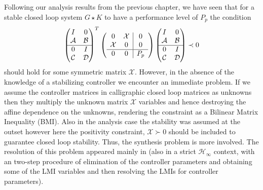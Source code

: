 Following our analysis results from the previous chapter, we have seen that for a stable closed loop system $G\star K$ to have 
a performance level of $P_p$ the condition
\[
\begin{pmatrix}I&0\\\mathcal{A}&\mathcal{B}\\\hline 0&I\\\mathcal{C}&\mathcal{D}\end{pmatrix}^T
\left(
\begin{array}{cc|c}
	0&\mathcal{X}&0\\\mathcal{X}&0&0\\\hline 0&0&P_p
\end{array}
\right)
\begin{pmatrix}I&0\\\mathcal{A}&\mathcal{B}\\\hline 0&I\\\mathcal{C}&\mathcal{D}\end{pmatrix}\prec 0
\]
should hold for some symmetric matrix $\mathcal{X}$. However, in the absence of the knowledge of a stabilizing controller we encounter
an immediate problem. If we assume the controller matrices in calligraphic closed loop matrices as unknowns then they multiply the unknown
matrix $\mathcal{X}$ variables and hence destroying the affine dependence on the unknowns, rendering the constraint as a Bilinear Matrix 
Inequality (BMI). Also in the analysis case the stability was assumed at the outset however here the positivity constraint,
$\mathcal{X}\succ 0$ should be included to guarantee closed loop stability. Thus, the synthesis problem is more involved. The resolution of 
this problem appeared mainly in \cite{scherermulti,izumi} (also in a strict $\mathcal{H}_\infty$ context, \cite{gahapk,gahinet96} with an
two-step procedure of elimination of the controller parameters and obtaining some of the LMI variables and then resolving the LMIs for controller 
parameters).

